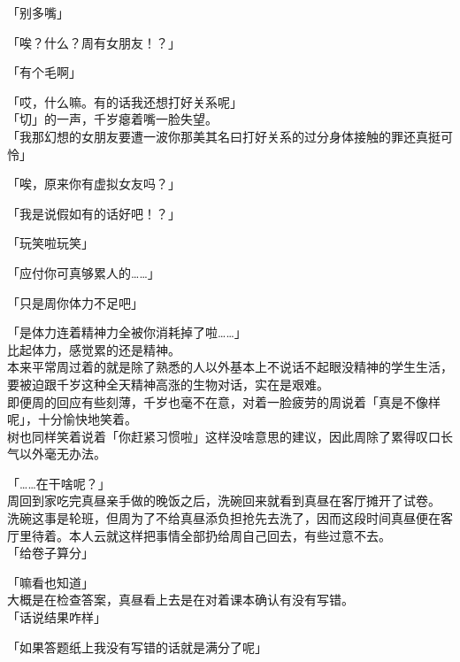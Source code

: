 「别多嘴」

「唉？什么？周有女朋友！？」

「有个毛啊」

「哎，什么嘛。有的话我还想打好关系呢」\\

「切」的一声，千岁瘪着嘴一脸失望。\\

「我那幻想的女朋友要遭一波你那美其名曰打好关系的过分身体接触的罪还真挺可怜」

「唉，原来你有虚拟女友吗？」

「我是说假如有的话好吧！？」

「玩笑啦玩笑」

「应付你可真够累人的……」

「只是周你体力不足吧」

「是体力连着精神力全被你消耗掉了啦……」\\

比起体力，感觉累的还是精神。\\

本来平常周过着的就是除了熟悉的人以外基本上不说话不起眼没精神的学生生活，要被迫跟千岁这种全天精神高涨的生物对话，实在是艰难。\\

即便周的回应有些刻薄，千岁也毫不在意，对着一脸疲劳的周说着「真是不像样呢」，十分愉快地笑着。\\

树也同样笑着说着「你赶紧习惯啦」这样没啥意思的建议，因此周除了累得叹口长气以外毫无办法。\\

\vspace{2\baselineskip}

「……在干啥呢？」\\

周回到家吃完真昼亲手做的晚饭之后，洗碗回来就看到真昼在客厅摊开了试卷。\\

洗碗这事是轮班，但周为了不给真昼添负担抢先去洗了，因而这段时间真昼便在客厅里待着。本人云就这样把事情全部扔给周自己回去，有些过意不去。\\

「给卷子算分」

「嘛看也知道」\\

大概是在检查答案，真昼看上去是在对着课本确认有没有写错。\\

「话说结果咋样」

「如果答题纸上我没有写错的话就是满分了呢」

